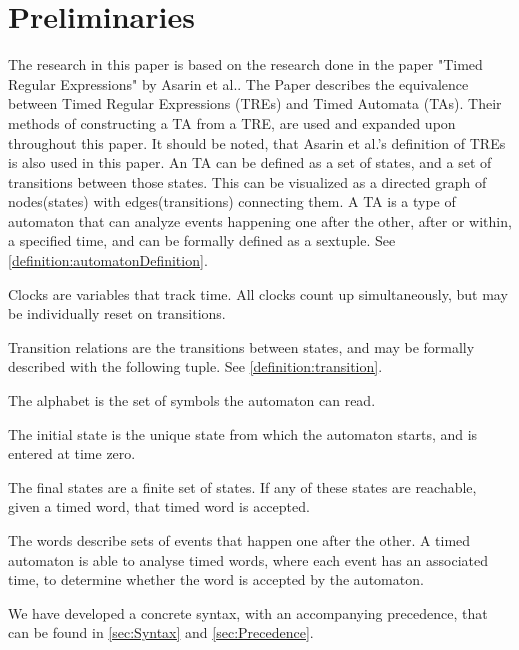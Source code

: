 \section{Preliminaries}\label{sec:preliminaries}






The research in this paper is based on the research done in the paper "Timed Regular Expressions" by Asarin et al.\cite{Eugene2001}. The Paper describes the equivalence between Timed Regular Expressions (TREs) and Timed Automata (TAs). Their methods of constructing a TA from a TRE, are used and expanded upon throughout this paper. It should be noted, that Asarin et al.'s definition of TREs is also used in this paper.
An TA can be defined as a set of states, and a set of transitions between those states. This can be visualized as a directed graph of nodes(states) with edges(transitions) connecting them.
A TA is a type of automaton that can analyze events happening one after the other, after or within, a specified time, and can be formally defined as a sextuple\cite{ALUR1994}. See \cref{definition:automatonDefinition}.


Clocks are variables that track time. All clocks count up simultaneously, but may be individually reset on transitions.

Transition relations are the transitions between states, and may be formally described with the following tuple. See \cref{definition:transition}.


The alphabet is the set of symbols the automaton can read.

The initial state is the unique state from which the automaton starts, and is entered at time zero.

The final states are a finite set of states. If any of these states are reachable, given a timed word, that timed word is accepted.

The words describe sets of events that happen one after the other. A timed automaton is able to analyse timed words, where each event has an associated time, to determine whether the word is accepted by the automaton.


We have developed a concrete syntax, with an accompanying precedence, that can be found in \cref{sec:Syntax} and \cref{sec:Precedence}.